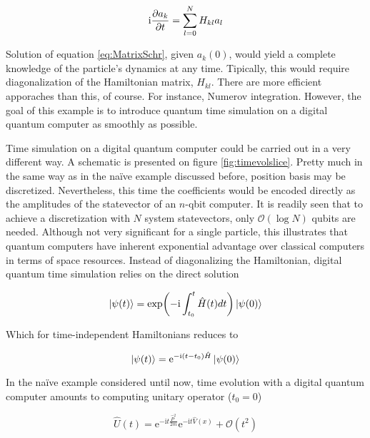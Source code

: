   \begin{equation}
    \mathrm{i}\pdv{a_k}{t} = \sum_{l = 0}^{N} H_{kl} a_l
    \label{eq:MatrixSchr}
  \end{equation}

  Solution of equation \ref{eq:MatrixSchr}, given $a_k(0)$, would yield a complete knowledge of the particle's dynamics at any time. Tipically, this would require diagonalization of the Hamiltonian matrix, $H_{kl}$. There are more efficient apporaches than this, of course. For instance, Numerov integration. However, the goal of this example is to introduce quantum time simulation on a digital quantum computer as smoothly as possible.

  Time simulation on a digital quantum computer could be carried out in a very different way. A schematic is presented on figure \ref{fig:timevolslice}. Pretty much in the same way as in the naïve example discussed before, position basis may be discretized. Nevertheless, this time the coefficients would be encoded directly as the amplitudes of the statevector of an $n$-qbit computer. It is readily seen that to achieve a discretization with $N$ system statevectors, only $\mathcal{O}(\log{N})$ qubits are needed. Although not very significant for a single particle, this illustrates that quantum computers have inherent exponential advantage over classical computers in terms of space resources. Instead of diagonalizing the Hamiltonian, digital quantum time simulation relies on the direct solution

  \begin{equation}
    \ket{\psi(t)} = \exp(-\mathrm{i}\int_{t_0}^t \hat{H}(t)dt)\ket{\psi(0)}
    \label{eq:UnitaryEvolution}
  \end{equation}

  Which for time-independent Hamiltonians reduces to

  \begin{equation}
    \ket{\psi(t)} = \mathrm{e}^{-\mathrm{i}(t - t_0) \hat{H}}\ket{\psi(0)}
    \label{eq:UnitaryEvolutionNoTime}
  \end{equation}

  In the naïve example considered until now, time evolution with a digital quantum computer amounts to computing unitary operator ($t_0 = 0$)

  \begin{equation}
    \hat{U}(t) = \mathrm{e}^{-\mathrm{i}t \frac{\hat{P}^2}{2m}}\mathrm{e}^{-\mathrm{i}t \hat{V}(x)} + \mathcal{O}(t^2)
  \end{equation}

